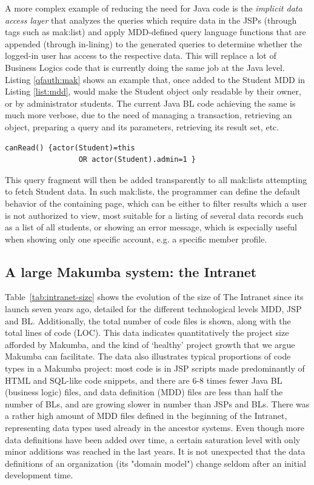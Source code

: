\documentclass{chi2009}
\begin{document}
A more complex example of reducing the need for Java code is the \textit{implicit data access layer} that analyzes the queries which require data in the JSPs (through tags such as mak:list) and apply MDD-defined query language functions that are appended (through in-lining)  to the generated queries to determine whether the  logged-in user has access to the respective data. This will replace a lot of Business Logics code that is currently doing the same job at the Java level. Listing \ref{qfauth:mak} shows an example that, once added to the Student MDD in Listing \ref{list:mdd}, would make the Student object only readable by their owner, or by administrator students. The current Java BL code achieving the same is much more verbose, due to the need of managing a transaction, retrieving an object, preparing a query and its parameters, retrieving its result set, etc.
\lstset{basicstyle=\small, captionpos=b, caption= query fragment authorization rule, label=qfauth:mak, frame=shadowbox}
\begin{lstlisting}
canRead() {actor(Student)=this 
                 OR actor(Student).admin=1 }
\end{lstlisting}
This query fragment will then be added transparently to all mak:lists attempting to fetch Student data. In such mak:lists, the programmer can define the default behavior of the containing page, which can be either to filter results which a user is not authorized to view, most suitable for a listing of several data records such as a list of all students, or showing an error message, which is especially useful when showing only one specific account, e.g. a specific member profile.



\subsection{A large Makumba system: the Intranet}
Table~\ref{tab:intranet-size} shows the evolution of the size of The Intranet since its launch seven years ago, detailed for the different technological levels MDD, JSP and BL. Additionally, the total number of code files is shown, along with the total lines of code (LOC). This data indicates quantitatively the project size afforded by Makumba, and the kind of `healthy' project growth that we argue Makumba can facilitate. The data also illustrates typical proportions of code types in a Makumba project: most code is in JSP scripts made predominantly of HTML and SQL-like code snippets, and there are 6-8 times fewer Java BL (business logic) files, and data definition (MDD) files are less than half the number of BLs, and are growing slower in number than JSPs and BLs. There was a rather high amount of MDD files defined in the beginning of the Intranet, representing data types used already in the ancestor systems. Even though more data definitions have been added over time, a certain saturation level with only minor additions was reached in the last years. It is not unexpected that the data definitions of an organization (its "domain model") change seldom after an initial development time. 
\end{document}
